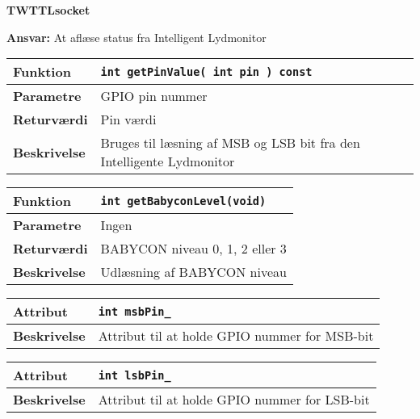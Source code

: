 {\centering
\textbf{TWTTLsocket}\par
}
\textbf{Ansvar:} At aflæse status fra Intelligent Lydmonitor \

\begin{center}
    \begin{tabular}{ | l | p{} |}
    \hline
    \textbf{Funktion}	& \verb+int getPinValue( int pin ) const +\\ \hline
    \textbf{Parametre} 	& GPIO pin nummer\\ \hline
    \textbf{Returværdi}	& Pin værdi\\ \hline
    \textbf{Beskrivelse}	& Bruges til læsning af MSB og LSB bit fra den Intelligente Lydmonitor\\ \hline
    \end{tabular}
\end{center}

\begin{center}
    \begin{tabular}{ | l | p{} |}
    \hline
    \textbf{Funktion}	& \verb+int getBabyconLevel(void) +\\ \hline
    \textbf{Parametre} 	& Ingen\\ \hline
    \textbf{Returværdi}	& BABYCON niveau 0, 1, 2 eller 3\\ \hline
    \textbf{Beskrivelse}	& Udlæsning af BABYCON niveau\\ \hline
    \end{tabular}
\end{center}

\begin{center}
    \begin{tabular}{ | l | p{} |}
    \hline
    \textbf{Attribut}	& \verb+int msbPin_ + \\ \hline
    \textbf{Beskrivelse}	& Attribut til at holde GPIO nummer for MSB-bit\\ \hline
    \end{tabular}
\end{center}

\begin{center}
    \begin{tabular}{ | l | p{} |}
    \hline
    \textbf{Attribut}	& \verb+int lsbPin_ +\\ \hline
    \textbf{Beskrivelse}	& Attribut til at holde GPIO nummer for LSB-bit\\ \hline
    \end{tabular}
\end{center}



